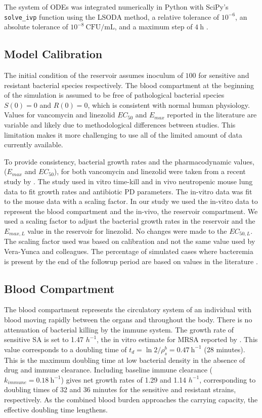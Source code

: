 \documentclass[utf8]{FrontiersinHarvard} %
\begin{document}
The system of ODEs was integrated numerically in Python with SciPy's
\texttt{solve\_ivp} function using the LSODA method, a relative tolerance
of $10^{-6}$, an absolute tolerance of $10^{-8}~\mathrm{CFU/mL}$, and a maximum
step of $4~\mathrm{h}$ \citep{2020SciPy-NMeth}.

\subsection{Model Calibration}
The initial condition of the reservoir assumes inoculum of $100$ for sensitive and resistant bacterial species respectively.
The blood compartment at the beginning of the simulation
is assumed to be free of pathological bacterial species $\mathit{S(0) = 0}$ and $\mathit{R(0) = 0}$, which is consistent with normal human physiology.  Values for vancomycin and linezolid $EC_{50}$ and $E_{max}$ reported in the literature
are variable and likely due to methodological differences between studies.  This limitation makes it more challenging
to use all of the limited amount of data currently available.

To provide consistency, bacterial growth rates and the pharmacodynamic values, ($E_{max}$ and $EC_{50}$), for both vancomycin and linezolid were taken from a recent study by \citet{VeraYunca2025}.
The study used in vitro time-kill and in vivo neutropenic mouse lung data to fit growth rates
and antibiotic PD parameters.  The in-vitro data was fit to the mouse data with a scaling factor.
In our study we used the in-vitro data to represent the blood compartment and the in-vivo, the reservoir compartment.
We used a scaling factor to adjust the bacterial growth rates in the reservoir and the $E_{max,L}$ value in the reservoir for linezolid.
No changes were made to the $EC_{50,L}$.  The scaling factor used was based on calibration and not the same value used by
Vera-Yunca and colleagues.  The percentage of simulated cases where bacteremia is present by the end of the followup period
are based on values in the literature \citep{garciadelpozo2018factors}.

\subsection{Blood Compartment}

The blood compartment represents the circulatory system of an individual with blood moving rapidly between the organs and throughout the body.  There is no attenuation of bacterial killing by the immune system. The growth rate of sensitive SA is set to 1.47 $h^{-1}$, the in vitro estimate for MRSA reported by \citet{VeraYunca2025}.  This value corresponds to a doubling time of $t_d = \ln 2 / \rho_s^{b} = 0.47~\mathrm{h}^{-1}$ (28 minutes). This is the maximum doubling time at low bacterial density in the absence of drug and immune clearance. Including baseline immune clearance ($k_{immune} = 0.18~\mathrm{h}^{-1}$) gives net growth rates of 1.29 and 1.14 ${h}^{-1}$, corresponding to doubling times of 32 and 36 minutes for the sensitive and resistant strains, respectively. As the combined blood burden approaches the carrying capacity, the effective doubling time lengthens.
\end{document}
